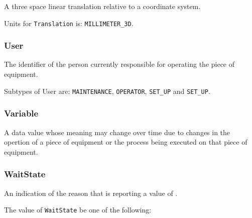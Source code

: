 A three space linear translation relative to a coordinate system.



Units for \texttt{Translation} is: \texttt{MILLIMETER_3D}.

\FloatBarrier

\subsubsection{User}
  \label{sec:User}


The identifier of the person currently responsible for operating the piece of equipment.


Subtypes of User are: \texttt{MAINTENANCE}, \texttt{OPERATOR}, \texttt{SET_UP} and \texttt{SET_UP}. 
\FloatBarrier

\subsubsection{Variable}
  \label{sec:Variable}


A data value whose meaning may change over time due to changes in the opertion of a piece of equipment or the process being executed on that piece of equipment.

\FloatBarrier

\subsubsection{WaitState}
  \label{sec:WaitState}


An indication of the reason that  is reporting a value of .


The value of \texttt{WaitState} \MUST be one of the following: 

